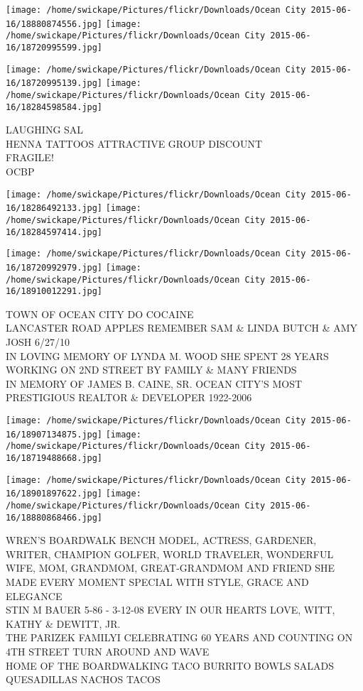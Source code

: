 \documentclass[10pt,letterpaper]{article}
\begin{document}
\texttt{[image: /home/swickape/Pictures/flickr/Downloads/Ocean City 2015-06-16/18880874556.jpg]}
\texttt{[image: /home/swickape/Pictures/flickr/Downloads/Ocean City 2015-06-16/18720995599.jpg]}

\texttt{[image: /home/swickape/Pictures/flickr/Downloads/Ocean City 2015-06-16/18720995139.jpg]}
\texttt{[image: /home/swickape/Pictures/flickr/Downloads/Ocean City 2015-06-16/18284598584.jpg]}

LAUGHING SAL\\
HENNA TATTOOS ATTRACTIVE GROUP DISCOUNT\\
FRAGILE!\\
OCBP
\pagebreak

\texttt{[image: /home/swickape/Pictures/flickr/Downloads/Ocean City 2015-06-16/18286492133.jpg]}
\texttt{[image: /home/swickape/Pictures/flickr/Downloads/Ocean City 2015-06-16/18284597414.jpg]}

\texttt{[image: /home/swickape/Pictures/flickr/Downloads/Ocean City 2015-06-16/18720992979.jpg]}
\texttt{[image: /home/swickape/Pictures/flickr/Downloads/Ocean City 2015-06-16/18910012291.jpg]}

TOWN OF OCEAN CITY DO COCAINE\\
LANCASTER ROAD APPLES REMEMBER SAM \& LINDA BUTCH \& AMY JOSH 6/27/10\\
IN LOVING MEMORY OF LYNDA M. WOOD SHE SPENT 28 YEARS WORKING ON 2ND STREET BY FAMILY \& MANY FRIENDS\\
IN MEMORY OF JAMES B. CAINE, SR. OCEAN CITY'S MOST PRESTIGIOUS REALTOR \& DEVELOPER 1922{-}2006
\pagebreak

\texttt{[image: /home/swickape/Pictures/flickr/Downloads/Ocean City 2015-06-16/18907134875.jpg]}
\texttt{[image: /home/swickape/Pictures/flickr/Downloads/Ocean City 2015-06-16/18719488668.jpg]}

\texttt{[image: /home/swickape/Pictures/flickr/Downloads/Ocean City 2015-06-16/18901897622.jpg]}
\texttt{[image: /home/swickape/Pictures/flickr/Downloads/Ocean City 2015-06-16/18880868466.jpg]}

WREN'S BOARDWALK BENCH MODEL, ACTRESS, GARDENER, WRITER, CHAMPION GOLFER, WORLD TRAVELER, WONDERFUL WIFE, MOM, GRANDMOM, GREAT{-}GRANDMOM AND FRIEND SHE MADE EVERY MOMENT SPECIAL WITH STYLE, GRACE AND ELEGANCE\\
STIN M BAUER 5{-}86 {-} 3{-}12{-}08 EVERY IN OUR HEARTS LOVE, WITT, KATHY \& DEWITT, JR.\\
THE PARIZEK FAMILYI CELEBRATING 60 YEARS AND COUNTING ON 4TH STREET TURN AROUND AND WAVE\\
HOME OF THE BOARDWALKING TACO BURRITO BOWLS SALADS QUESADILLAS NACHOS TACOS
\pagebreak
\end{document}
